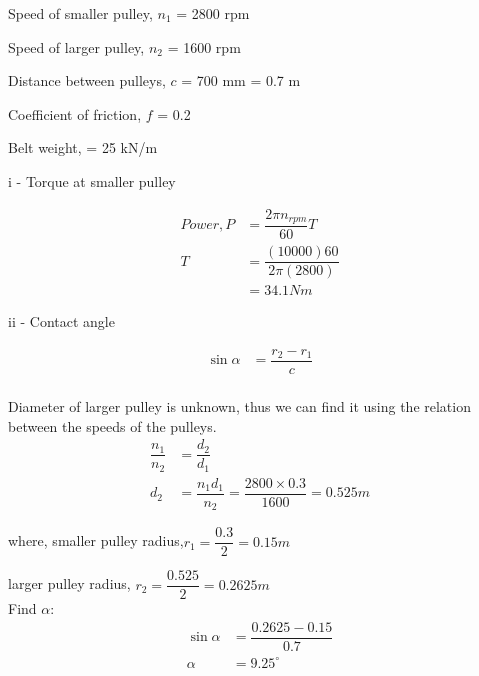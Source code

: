 \documentclass[a4paper, fleqn]{article}
\begin{document}
Speed of smaller pulley, $n_1$ = 2800 rpm

Speed of larger pulley, $n_2$ = 1600 rpm

Distance between pulleys, $c$ = 700 mm = 0.7 m

Coefficient of friction, $f$ = 0.2

Belt weight, = 25 kN/m

\vspace{10pt}
i - Torque at smaller pulley

\begin{equation*}
    \begin{aligned}
    Power, P &= \dfrac{2\pi n_{rpm}}{60} T\\
    T &= \dfrac{(10000) 60}{2 \pi (2800)}\\
    &=34.1 Nm
    \end{aligned}
\end{equation*}

ii - Contact angle

\begin{equation*}
    \begin{aligned}
    \sin \alpha &= \dfrac{r_2 - r_1}{c}\\
    \end{aligned}
\end{equation*}

Diameter of larger pulley is unknown, thus we can find it using the relation between the speeds of the pulleys.
\begin{equation*}
    \begin{aligned}
    \dfrac{n_1}{n_2} &= \dfrac{d_2}{d_1}\\
    d_2 &= \dfrac{n_1 d_1}{n_2} = \dfrac{2800 \times 0.3}{1600} = 0.525 m
    \end{aligned}
\end{equation*}

where, smaller pulley radius,$r_1 = \dfrac{0.3}{2} = 0.15 m$
\vspace{10pt}

larger pulley radius, $r_2  = \dfrac{0.525}{2} = 0.2625 m$\\

Find $\alpha$:
\begin{equation*}
    \begin{aligned}
    \sin \alpha &= \dfrac{0.2625 - 0.15}{0.7}\\
    \alpha &= 9.25^{\circ}\\
    \end{aligned}
\end{equation*}
\end{document}
